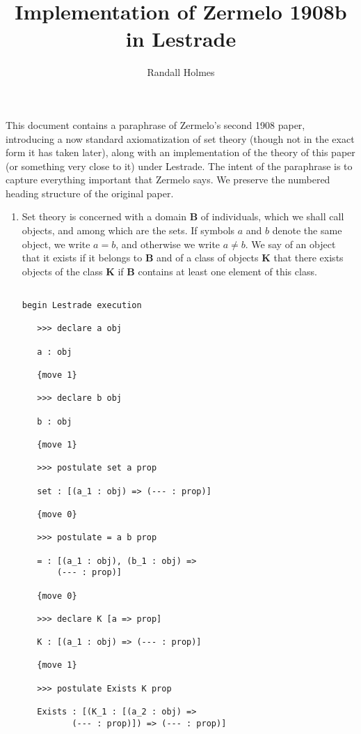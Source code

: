 \documentclass[12pt]{article}
\title{Implementation of Zermelo 1908b in Lestrade}
\author{Randall Holmes}
\begin{document}
\maketitle

This document contains a paraphrase of Zermelo's second 1908 paper, introducing a now standard axiomatization of set theory (though not in the exact form it has taken later), along with an implementation of the theory of this paper (or something very close to it) under Lestrade.  The intent of the paraphrase is to capture everything important that Zermelo says.  We preserve the numbered heading structure of the original paper.

\begin{enumerate}


\item  Set theory is concerned with a domain {\bf B} of individuals, which we shall call objects, and among which are the sets.  If symbols $a$ and $b$ denote the same object, we write $a=b$, and otherwise we write $a \neq b$.  We say of an object that it exists if it belongs to {\bf B} and of a class of objects {\bf K} that there exists objects of the class {\bf K} if {\bf B} contains at least one element of this class.

\begin{verbatim}

begin Lestrade execution

   >>> declare a obj

   a : obj

   {move 1}

   >>> declare b obj

   b : obj

   {move 1}

   >>> postulate set a prop

   set : [(a_1 : obj) => (--- : prop)]

   {move 0}

   >>> postulate = a b prop

   = : [(a_1 : obj), (b_1 : obj) => 
       (--- : prop)]

   {move 0}

   >>> declare K [a => prop]

   K : [(a_1 : obj) => (--- : prop)]

   {move 1}

   >>> postulate Exists K prop

   Exists : [(K_1 : [(a_2 : obj) => 
          (--- : prop)]) => (--- : prop)]


\end{verbatim}
\end{enumerate}
\end{document}
